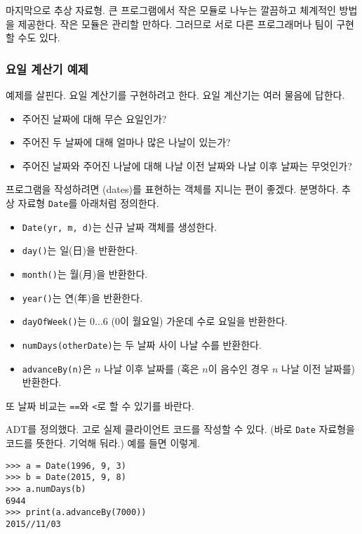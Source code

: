 \documentclass[a4paper]{oblivoir}
\begin{document}
마지막으로 추상 자료형. 큰 프로그램에서 작은 모듈로 나누는 깔끔하고 체계적인 방법을 제공한다. 작은 모듈은 관리할 만하다. 그러므로 서로 다른 프로그래머나 팀이 구현할 수도 있다.

\subsubsection*{요일 계산기 예제}

예제를 살핀다. 요일 계산기를 구현하려고 한다. 요일 계산기는 여러 물음에 답한다.

\begin{itemize}
    \setlength\itemsep{-0.5em}
    \item 주어진 날짜에 대해 무슨 요일인가?
    \item 주어진 두 날짜에 대해 얼마나 많은 나날이 있는가?
    \item 주어진 날짜와 주어진 나날에 대해 나날 이전 날짜와 나날 이후 날짜는 무엇인가?
\end{itemize}

프로그램을 작성하려면 (dates)를 표현하는 객체를 지니는 편이 좋겠다. 분명하다. 추상 자료형 \texttt{Date}를 아래처럼 정의한다.

\begin{itemize}
    \setlength\itemsep{-0.5em}
    \item \texttt{Date(yr, m, d)}는 신규 날짜 객체를 생성한다.
    \item \texttt{day()}는 일(日)을 반환한다.
    \item \texttt{month()}는 월(月)을 반환한다.
    \item \texttt{year()}는 연(年)을 반환한다. 
    \item \texttt{dayOfWeek()}는 $0\ldots6$ ($0$이 월요일) 가운데 수로 요일을 반환한다.
    \item \texttt{numDays(otherDate)}는 두 날짜 사이 나날 수를 반환한다.
    \item \texttt{advanceBy(n)}은 $n$ 나날 이후 날짜를 (혹은 $n$이 음수인 경우 $n$ 나날 이전 날짜를) 반환한다.
\end{itemize}

또 날짜 비교는 \texttt{==}와 \texttt{<}로 할 수 있기를 바란다.

ADT를 정의했다. 고로 실제 클라이언트 코드를 작성할 수 있다. (바로 \texttt{Date} 자료형을  코드를 뜻한다. 기억해 둬라.) 예를 들면 이렇게.

\begin{lstlisting}
>>> a = Date(1996, 9, 3)
>>> b = Date(2015, 9, 8)
>>> a.numDays(b)
6944
>>> print(a.advanceBy(7000))
2015//11/03
\end{lstlisting}
\end{document}
